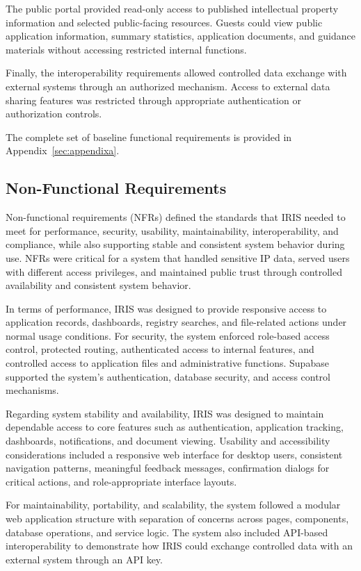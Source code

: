 The public portal provided read-only access to published intellectual property information and selected public-facing resources. Guests could view public application information, summary statistics, application documents, and guidance materials without accessing restricted internal functions.

Finally, the interoperability requirements allowed controlled data exchange with external systems through an authorized mechanism. Access to external data sharing features was restricted through appropriate authentication or authorization controls.

The complete set of baseline functional requirements is provided in Appendix~\ref{sec:appendixa}.

\subsection{Non-Functional Requirements}

Non-functional requirements (NFRs) defined the standards that IRIS needed to meet for performance, security, usability, maintainability, interoperability, and compliance, while also supporting stable and consistent system behavior during use. NFRs were critical for a system that handled sensitive IP data, served users with different access privileges, and maintained public trust through controlled availability and consistent system behavior.

In terms of performance, IRIS was designed to provide responsive access to application records, dashboards, registry searches, and file-related actions under normal usage conditions. For security, the system enforced role-based access control, protected routing, authenticated access to internal features, and controlled access to application files and administrative functions. Supabase supported the system's authentication, database security, and access control mechanisms.

Regarding system stability and availability, IRIS was designed to maintain dependable access to core features such as authentication, application tracking, dashboards, notifications, and document viewing. Usability and accessibility considerations included a responsive web interface for desktop users, consistent navigation patterns, meaningful feedback messages, confirmation dialogs for critical actions, and role-appropriate interface layouts.

For maintainability, portability, and scalability, the system followed a modular web application structure with separation of concerns across pages, components, database operations, and service logic. The system also included API-based interoperability to demonstrate how IRIS could exchange controlled data with an external system through an API key.

